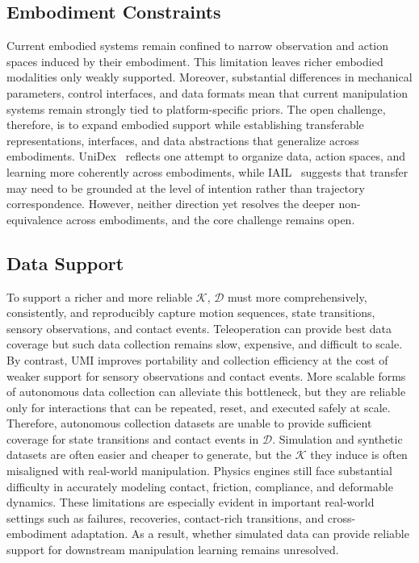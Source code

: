 \documentclass[acmsmall,screen,review]{acmart}
\begin{document}
\subsection{Embodiment Constraints}\label{sec:challenge_embodiment}

Current embodied systems remain confined to narrow observation and action spaces induced by their embodiment.
This limitation leaves richer embodied modalities only weakly supported. 
Moreover, substantial differences in mechanical parameters, control interfaces, and data formats mean that current manipulation systems remain strongly tied to platform-specific priors.
The open challenge, therefore, is to expand embodied support while establishing transferable representations, interfaces, and data abstractions that generalize across embodiments.
UniDex~\cite{zhang2026unidex} reflects one attempt to organize data, action spaces, and learning more coherently across embodiments, 
while IAIL~\cite{chen2026iail} suggests that transfer may need to be grounded at the level of intention rather than trajectory correspondence. 
However, neither direction yet resolves the deeper non-equivalence across embodiments, and the core challenge remains open.

\subsection{Data Support}\label{sec:challenge_data}

To support a richer and more reliable $\mathcal{K}$, $\mathcal{D}$ must more comprehensively, consistently, and reproducibly capture motion sequences, state transitions, sensory observations, and contact events.
Teleoperation can provide best data coverage but such data collection remains slow, expensive, and difficult to scale.
By contrast, UMI improves portability and collection efficiency at the cost of weaker support for sensory observations and contact events. 
More scalable forms of autonomous data collection can alleviate this bottleneck, but they are reliable only for interactions that can be repeated, reset, and executed safely at scale.
Therefore, autonomous collection datasets are unable to provide sufficient coverage for state transitions and contact events in \(\mathcal{D}\).
Simulation and synthetic datasets are often easier and cheaper to generate, but the \(\mathcal{K}\) they induce is often misaligned with real-world manipulation. 
Physics engines still face substantial difficulty in accurately modeling contact, friction, compliance, and deformable dynamics.
These limitations are especially evident in important real-world settings such as failures, recoveries, contact-rich transitions, and cross-embodiment adaptation.
As a result, whether simulated data can provide reliable support for downstream manipulation learning remains unresolved.
\end{document}

